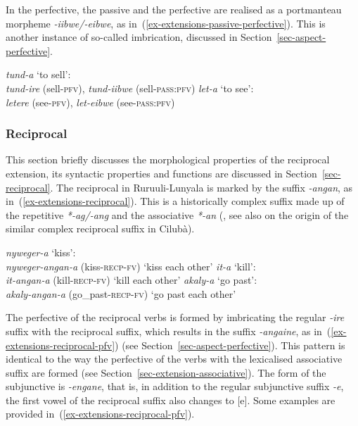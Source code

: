 In the perfective, the passive and the perfective are realised as a portmanteau morpheme \textit{-iibwe/-eibwe}, as in~(\ref{ex-extensions-passive-perfective}). 
This is another instance of so-called imbrication, discussed in Section~\ref{sec-aspect-perfective}.  

\ea \label{ex-extensions-passive-perfective}
\begin{xlist}
\ex\textit{tund-a}	`to sell':\\
\textit{tund-ire} (sell-\textsc{pfv}),  \textit{tund-iibwe} (sell-\textsc{pass}:\textsc{pfv})
\ex\textit{let-a}	`to see':\\
\textit{letere} (see-\textsc{pfv}), \textit{let-eibwe} (see-\textsc{pass}:\textsc{pfv})
\end{xlist}
\z


\subsubsection{Reciprocal}\label{sec-extension-reciprocal}

This section briefly discusses the morphological properties of the reciprocal extension, 
its syntactic properties and functions are discussed in Section~\ref{sec-reciprocal}. 
The reciprocal in Ru\-ruu\-li\hyp{}Lu\-nya\-la is marked by the suffix \textit{-angan}, as in~(\ref{ex-extensions-reciprocal}). 
 This is a historically complex suffix made up of the repetitive \textit{*-ag/-ang} and the associative \textit{*-an} (\citealt[173]{Schadebergetal2019Bantu}, see also \citealt[378]{Dometal2015Antipassive} on the origin of the similar complex reciprocal suffix in Cilubà).  

\ea \label{ex-extensions-reciprocal}
\begin{xlist}
\ex\textit{nyweger-a}	`kiss':\\
\textit{nyweger-angan-a} (kiss-\textsc{recp}-\textsc{fv}) `kiss each other'
\ex\textit{it-a}	`kill': \\
\textit{it-angan-a} (kill-\textsc{recp}-\textsc{fv}) `kill each other'
\ex\textit{akaly-a}	`go past': \\
\textit{akaly-angan-a} (go\_past-\textsc{recp}-\textsc{fv}) `go past each other'
\end{xlist}
\z

The perfective of the reciprocal verbs is formed by imbricating the regular \textit{-ire} suffix with the reciprocal suffix, which results in the suffix \mbox{\textit{-angaine}}, as in~(\ref{ex-extensions-reciprocal-pfv}) (see Section~\ref{sec-aspect-perfective}). 
This pattern is identical to the way the perfective of the verbs with the lexicalised associative suffix are formed (see Section~\ref{sec-extension-associative}).  
The form of the subjunctive is \textit{-engane}, that is, in addition to the regular subjunctive suffix \textit{-e}, the first vowel of the reciprocal suffix also changes to [e]. Some examples are provided in~(\ref{ex-extensions-reciprocal-pfv}).
 
